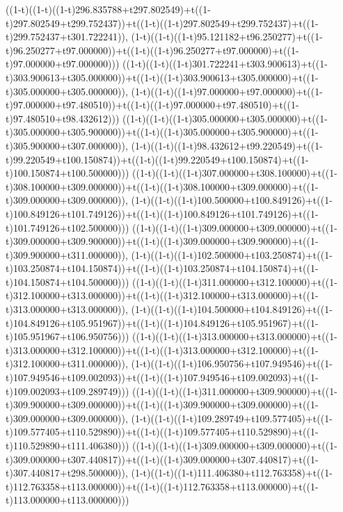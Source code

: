 ((1-t)((1-t)((1-t)296.835788+t297.802549)+t((1-t)297.802549+t299.752437))+t((1-t)((1-t)297.802549+t299.752437)+t((1-t)299.752437+t301.722241)),                                     (1-t)((1-t)((1-t)95.121182+t96.250277)+t((1-t)96.250277+t97.000000))+t((1-t)((1-t)96.250277+t97.000000)+t((1-t)97.000000+t97.000000)))
((1-t)((1-t)((1-t)301.722241+t303.900613)+t((1-t)303.900613+t305.000000))+t((1-t)((1-t)303.900613+t305.000000)+t((1-t)305.000000+t305.000000)),                                     (1-t)((1-t)((1-t)97.000000+t97.000000)+t((1-t)97.000000+t97.480510))+t((1-t)((1-t)97.000000+t97.480510)+t((1-t)97.480510+t98.432612)))
((1-t)((1-t)((1-t)305.000000+t305.000000)+t((1-t)305.000000+t305.900000))+t((1-t)((1-t)305.000000+t305.900000)+t((1-t)305.900000+t307.000000)),                                     (1-t)((1-t)((1-t)98.432612+t99.220549)+t((1-t)99.220549+t100.150874))+t((1-t)((1-t)99.220549+t100.150874)+t((1-t)100.150874+t100.500000)))
((1-t)((1-t)((1-t)307.000000+t308.100000)+t((1-t)308.100000+t309.000000))+t((1-t)((1-t)308.100000+t309.000000)+t((1-t)309.000000+t309.000000)),                                     (1-t)((1-t)((1-t)100.500000+t100.849126)+t((1-t)100.849126+t101.749126))+t((1-t)((1-t)100.849126+t101.749126)+t((1-t)101.749126+t102.500000)))
((1-t)((1-t)((1-t)309.000000+t309.000000)+t((1-t)309.000000+t309.900000))+t((1-t)((1-t)309.000000+t309.900000)+t((1-t)309.900000+t311.000000)),                                     (1-t)((1-t)((1-t)102.500000+t103.250874)+t((1-t)103.250874+t104.150874))+t((1-t)((1-t)103.250874+t104.150874)+t((1-t)104.150874+t104.500000)))
((1-t)((1-t)((1-t)311.000000+t312.100000)+t((1-t)312.100000+t313.000000))+t((1-t)((1-t)312.100000+t313.000000)+t((1-t)313.000000+t313.000000)),                                     (1-t)((1-t)((1-t)104.500000+t104.849126)+t((1-t)104.849126+t105.951967))+t((1-t)((1-t)104.849126+t105.951967)+t((1-t)105.951967+t106.950756)))
((1-t)((1-t)((1-t)313.000000+t313.000000)+t((1-t)313.000000+t312.100000))+t((1-t)((1-t)313.000000+t312.100000)+t((1-t)312.100000+t311.000000)),                                     (1-t)((1-t)((1-t)106.950756+t107.949546)+t((1-t)107.949546+t109.002093))+t((1-t)((1-t)107.949546+t109.002093)+t((1-t)109.002093+t109.289749)))
((1-t)((1-t)((1-t)311.000000+t309.900000)+t((1-t)309.900000+t309.000000))+t((1-t)((1-t)309.900000+t309.000000)+t((1-t)309.000000+t309.000000)),                                     (1-t)((1-t)((1-t)109.289749+t109.577405)+t((1-t)109.577405+t110.529890))+t((1-t)((1-t)109.577405+t110.529890)+t((1-t)110.529890+t111.406380)))
((1-t)((1-t)((1-t)309.000000+t309.000000)+t((1-t)309.000000+t307.440817))+t((1-t)((1-t)309.000000+t307.440817)+t((1-t)307.440817+t298.500000)),                                     (1-t)((1-t)((1-t)111.406380+t112.763358)+t((1-t)112.763358+t113.000000))+t((1-t)((1-t)112.763358+t113.000000)+t((1-t)113.000000+t113.000000)))
